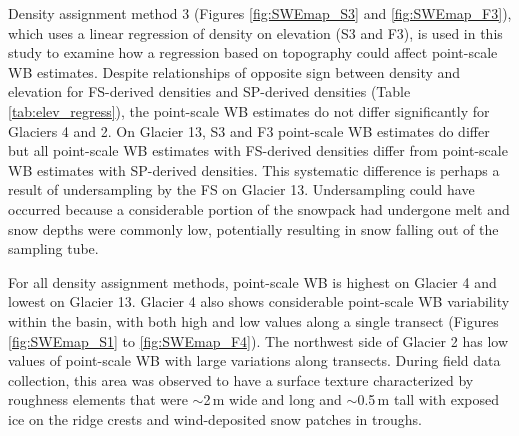 \documentclass{sfuthesis}
\begin{document}
{Density assignment method 3 (Figures \ref{fig:SWEmap_S3} and \ref{fig:SWEmap_F3}), which uses a linear regression of density on elevation (S3 and F3), is used in this study to examine how a regression based on topography could affect point-scale WB estimates. Despite relationships of opposite sign between density and elevation for FS-derived densities and SP-derived densities (Table \ref{tab:elev_regress}), the point-scale WB estimates do not differ significantly for Glaciers 4 and 2. On Glacier 13, S3 and F3 point-scale WB estimates do differ but all point-scale WB estimates with FS-derived densities differ from point-scale WB estimates with SP-derived densities. This systematic difference is perhaps a result of undersampling by the FS on Glacier 13. Undersampling could have occurred because a considerable portion of the snowpack had undergone melt and snow depths were commonly low, potentially resulting in snow falling out of the sampling tube. 

For all density assignment methods, point-scale WB is highest on Glacier 4 and lowest on Glacier 13. Glacier 4 also shows considerable point-scale WB variability within the basin, with both high and low values along a single transect (Figures \ref{fig:SWEmap_S1} to \ref{fig:SWEmap_F4}). The northwest side of Glacier 2 has low values of point-scale WB with large variations along transects. During field data collection, this area was observed to have a surface texture characterized by roughness elements that were $\sim$2\,m wide and long and $\sim$0.5\,m tall with exposed ice on the ridge crests and wind-deposited snow patches in troughs.



}
\end{document}
